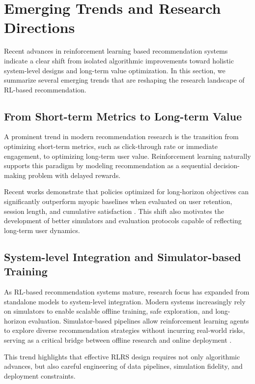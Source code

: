 \section{Emerging Trends and Research Directions}

Recent advances in reinforcement learning based recommendation systems indicate a clear shift from isolated algorithmic improvements toward holistic system-level designs and long-term value optimization. In this section, we summarize several emerging trends that are reshaping the research landscape of RL-based recommendation.

\subsection{From Short-term Metrics to Long-term Value}

A prominent trend in modern recommendation research is the transition from optimizing short-term metrics, such as click-through rate or immediate engagement, to optimizing long-term user value. Reinforcement learning naturally supports this paradigm by modeling recommendation as a sequential decision-making problem with delayed rewards.

Recent works demonstrate that policies optimized for long-horizon objectives can significantly outperform myopic baselines when evaluated on user retention, session length, and cumulative satisfaction \cite{Zhu2021DeepExploration,Ayed2025RecoMind}. This shift also motivates the development of better simulators and evaluation protocols capable of reflecting long-term user dynamics.

\subsection{System-level Integration and Simulator-based Training}

As RL-based recommendation systems mature, research focus has expanded from standalone models to system-level integration. Modern systems increasingly rely on simulators to enable scalable offline training, safe exploration, and long-horizon evaluation. Simulator-based pipelines allow reinforcement learning agents to explore diverse recommendation strategies without incurring real-world risks, serving as a critical bridge between offline research and online deployment \cite{Afsar2021Survey,Ayed2025RecoMind}.

This trend highlights that effective RLRS design requires not only algorithmic advances, but also careful engineering of data pipelines, simulation fidelity, and deployment constraints.

